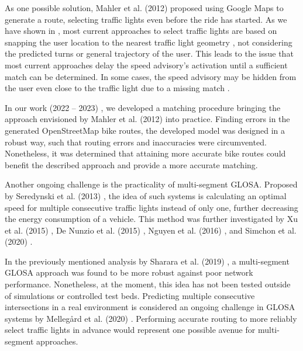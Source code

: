 As one possible solution, Mahler et al. (2012) \cite{mahler_reducing_2012} proposed using Google Maps to generate a route, selecting traffic lights even before the ride has started. As we have shown in , most current approaches to select traffic lights are based on snapping the user location to the nearest traffic light geometry \cite{katsaros_performance_2011, bernais_design_2016, wilson_driver_2017, stahlmann_exploring_2018, bhattacharyya_assessing_2022}, not considering the predicted turns or general trajectory of the user. This leads to the issue that most current approaches delay the speed advisory's activation until a sufficient match can be determined. In some cases, the speed advisory may be hidden from the user even close to the traffic light due to a missing match \cite{wilson_driver_2017, stahlmann_exploring_2018}.

In our work (2022 -- 2023) \cite{matthes2022matching, matthes2023geo}, we developed a matching procedure bringing the approach envisioned by Mahler et al. (2012) \cite{mahler_reducing_2012} into practice. Finding errors in the generated OpenStreetMap bike routes, the developed model was designed in a robust way, such that routing errors and inaccuracies were circumvented. Nonetheless, it was determined that attaining more accurate bike routes could benefit the described approach and provide a more accurate matching.

Another ongoing challenge is the practicality of multi-segment GLOSA. Proposed by Seredynski et al. (2013) \cite{seredynski_comparison_2013, seredynski_multi-segment_2013}, the idea of such systems is calculating an optimal speed for multiple consecutive traffic lights instead of only one, further decreasing the energy consumption of a vehicle. This method was further investigated by Xu et al. (2015) \cite{xu_bb_2015}, De Nunzio et al. (2015) \cite{de_nunzio_eco-driving_2015}, Nguyen et al. (2016) \cite{nguyen_efficient_2016}, and Simchon et al. (2020) \cite{simchon_real-time_2020}. 

In the previously mentioned analysis by Sharara et al. (2019) \cite{sharara_impact_2019}, a multi-segment GLOSA approach was found to be more robust against poor network performance. Nonetheless, at the moment, this idea has not been tested outside of simulations or controlled test beds. Predicting multiple consecutive intersections in a real environment is considered an ongoing challenge in GLOSA systems by Mellegård et al. (2020) \cite{mellegard_day_2020}. Performing accurate routing to more reliably select traffic lights in advance would represent one possible avenue for multi-segment approaches.

